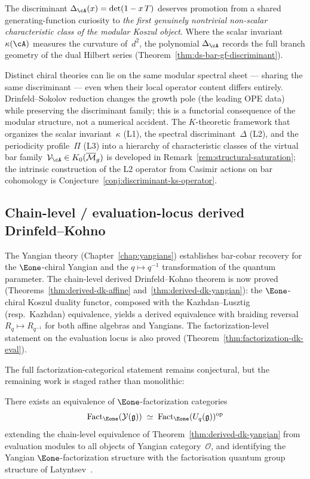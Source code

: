 The discriminant $\Delta_{\cA}(x) = \det(1 - x\,T)$ deserves
promotion from a shared generating-function curiosity to
\emph{the first genuinely nontrivial non-scalar characteristic class
of the modular Koszul object}.  Where the scalar invariant
$\kappa(\cA)$ measures the curvature of~$d^2$, the polynomial
$\Delta_{\cA}$ records the full branch geometry of the dual
Hilbert series (Theorem~\ref{thm:ds-bar-gf-discriminant}).

Distinct chiral theories can lie on the same modular spectral
sheet --- sharing the same discriminant --- even when their local
operator content differs entirely.  Drinfeld--Sokolov reduction
changes the growth pole (the leading OPE data) while preserving
the discriminant family; this is a functorial consequence of the
modular structure, not a numerical accident.
The $K$-theoretic framework that organizes the scalar
invariant~$\kappa$ (L1), the spectral discriminant~$\Delta$ (L2),
and the periodicity profile~$\Pi$ (L3) into a hierarchy of
characteristic classes of the virtual bar
family~$\mathcal{V}_{\cA} \in K_0(\overline{\mathcal{M}}_g)$
is developed in Remark~\ref{rem:structural-saturation}; the
intrinsic construction of the L2 operator from Casimir actions
on bar cohomology is Conjecture~\ref{conj:discriminant-ks-operator}.

\subsection{Chain-level / evaluation-locus derived Drinfeld--Kohno}

The Yangian theory (Chapter~\ref{chap:yangians}) establishes bar-cobar
recovery for the $\Eone$-chiral Yangian and the $q \mapsto q^{-1}$
transformation of the quantum parameter.  The chain-level derived
Drinfeld--Kohno theorem is now proved
(Theorems~\ref{thm:derived-dk-affine}
and~\ref{thm:derived-dk-yangian}): the $\Eone$-chiral Koszul duality
functor, composed with the Kazhdan--Lusztig (resp.\ Kazhdan)
equivalence, yields a derived equivalence with braiding reversal
$R_q \mapsto R_{q^{-1}}$ for both affine algebras and Yangians.
The factorization-level statement on the evaluation locus is also
proved (Theorem~\ref{thm:factorization-dk-eval}).

The full factorization-categorical statement remains conjectural, but
the remaining work is staged rather than monolithic:

\begin{conjecture}
\label{conj:derived-drinfeld-kohno}
There exists an equivalence of $\Eone$-factorization categories
\[
\operatorname{Fact}_{\Eone}(\mathcal{Y}(\mathfrak{g}))
\;\simeq\;
\operatorname{Fact}_{\Eone}(U_q(\mathfrak{g}))^{\mathrm{op}}
\]
extending the chain-level equivalence of
Theorem~\textup{\ref{thm:derived-dk-yangian}}
from evaluation modules to all objects of Yangian
category~$\mathcal{O}$, and identifying the Yangian
$\Eone$-factorization structure with the factorisation quantum
group structure of Latyntsev~\cite{Latyntsev23}.
\end{conjecture}

